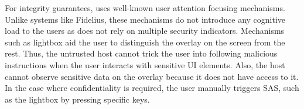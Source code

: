For integrity guarantees, \name uses well-known user attention focusing mechanisms. Unlike systems like Fidelius, these mechanisms do not introduce any cognitive load to the users as \name does not rely on multiple security indicators. Mechanisms such as lightbox aid the user to distinguish the \device overlay on the screen from the rest. Thus, the untrusted host cannot trick the user into following malicious instructions when the user interacts with sensitive UI elements. Also, the host cannot observe sensitive data on the overlay because it does not have access to it. In the case where confidentiality is required, the user manually triggers SAS, such as the lightbox by pressing specific keys.

 
